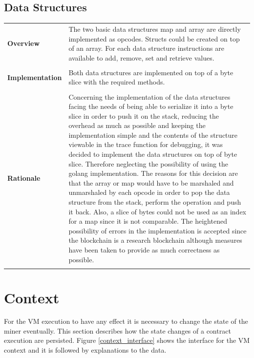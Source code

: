 \subsection{Data Structures}
\begin{tabular}[t]{ p{3cm} p{12.5cm}}
\raggedright
\textbf{Overview} & 
The two basic data structures map and array are directly implemented as opcodes. Structs could be created on top of an array. For each data structure instructions are available to add, remove, set and retrieve values.\\ \\

\raggedright
\textbf{Implementation} & 
Both data structures are implemented on top of a byte slice with the required methods.
 \\ \\
 
\raggedright
\textbf{Rationale} & 
Concerning the implementation of the data structures facing the needs of being able to serialize it into a byte slice in order to push it on the stack, reducing the overhead as much as possible and keeping the implementation simple and the contents of the structure viewable in the trace function for debugging, it was decided to implement the data structures on top of byte slice. Therefore neglecting the possibility of using the golang implementation. The reasons for this decision are that the array or map would have to be marshaled and unmarshaled by each opcode in order to pop the data structure from the stack, perform the operation and push it back. Also, a slice of bytes could not be used as an index for a map since it is not comparable. The heightened possibility of errors in the implementation is accepted since the blockchain is a research blockchain although measures have been taken to provide as much correctness as possible.  \\ \\
\end{tabular}
\section{Context}
For the VM execution to have any effect it is necessary to change the state of the miner eventually. This section describes how the state changes of a contract execution are persisted. Figure \ref{context_interface} shows the interface for the VM context and it is followed by explanations to the data.  

